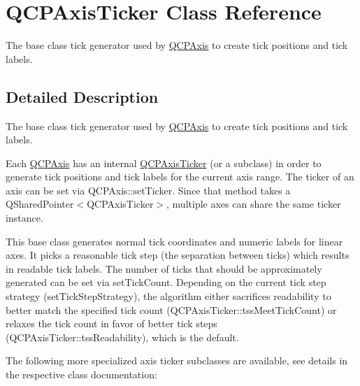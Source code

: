 \hypertarget{class_q_c_p_axis_ticker}{}\section{Q\+C\+P\+Axis\+Ticker Class Reference}
\label{class_q_c_p_axis_ticker}


The base class tick generator used by \mbox{\hyperlink{class_q_c_p_axis}{Q\+C\+P\+Axis}} to create tick positions and tick labels.  




\subsection{Detailed Description}
The base class tick generator used by \mbox{\hyperlink{class_q_c_p_axis}{Q\+C\+P\+Axis}} to create tick positions and tick labels. 

Each \mbox{\hyperlink{class_q_c_p_axis}{Q\+C\+P\+Axis}} has an internal \mbox{\hyperlink{class_q_c_p_axis_ticker}{Q\+C\+P\+Axis\+Ticker}} (or a subclass) in order to generate tick positions and tick labels for the current axis range. The ticker of an axis can be set via Q\+C\+P\+Axis\+::set\+Ticker. Since that method takes a {\ttfamily Q\+Shared\+Pointer$<$\+Q\+C\+P\+Axis\+Ticker$>$}, multiple axes can share the same ticker instance.

This base class generates normal tick coordinates and numeric labels for linear axes. It picks a reasonable tick step (the separation between ticks) which results in readable tick labels. The number of ticks that should be approximately generated can be set via set\+Tick\+Count. Depending on the current tick step strategy (set\+Tick\+Step\+Strategy), the algorithm either sacrifices readability to better match the specified tick count (Q\+C\+P\+Axis\+Ticker\+::tss\+Meet\+Tick\+Count) or relaxes the tick count in favor of better tick steps (Q\+C\+P\+Axis\+Ticker\+::tss\+Readability), which is the default.

The following more specialized axis ticker subclasses are available, see details in the respective class documentation\+:

